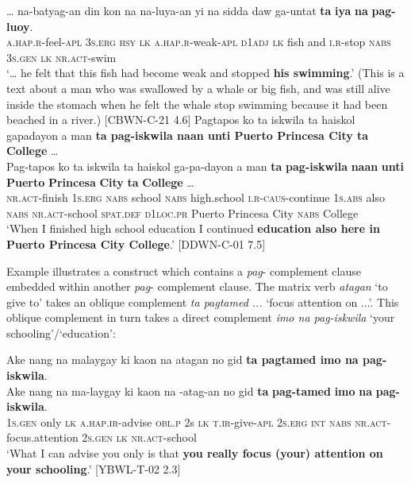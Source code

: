 \gll … na-batyag-an  din  kon  na  na-luya-an  yi  na  sidda daw  ga-untat  \textbf{ta}  \textbf{iya}  \textbf{na}  \textbf{pag-luoy}. \\
{}  \textsc{a.hap.r}-feel-\textsc{apl}  3\textsc{s.erg}  \textsc{hsy}  \textsc{lk}  \textsc{a.hap.r}-weak-\textsc{apl}  \textsc{d}1\textsc{adj}  \textsc{lk}  fish
and  \textsc{i.r}-stop  \textsc{nabs}  3\textsc{s.gen}  \textsc{lk}  \textsc{nr.act}-swim \\
\glt `… he felt that this fish had become weak and stopped \textbf{his swimming}.’ (This is a text about a man who was swallowed by a whale or big fish, and was still alive inside the stomach when he felt the whale stop swimming because it had been beached in a river.) [CBWN-C-21 4.6]
\z
\ea
\label{bkm:Ref114821264}
Pagtapos  ko  ta  iskwila  ta  haiskol  gapadayon a  man  \textbf{ta  pag-iskwila  naan  unti Puerto Princesa City  ta  College} … \smallskip\\
\gll Pag-tapos  ko  ta  iskwila  ta  haiskol  ga-pa-dayon a  man  \textbf{ta}  \textbf{pag-iskwila}  \textbf{naan}  \textbf{unti} \textbf{Puerto} \textbf{Princesa} \textbf{City}  \textbf{ta}  \textbf{College} … \\
\textsc{nr.act}-finish  1\textsc{s.erg}  \textsc{nabs}  school  \textsc{nabs}  high.school  \textsc{i.r}-\textsc{caus}-continue
1\textsc{s.abs}  also  \textsc{nabs}  \textsc{nr.act}-school  \textsc{spat.def}  \textsc{d}1\textsc{loc.pr}
Puerto Princesa City  \textsc{nabs}  College \\
\glt `When I finished high school education I continued \textbf{education also here in Puerto Princesa City College}.’ [DDWN-C-01 7.5]
\z

Example  illustrates a construct which contains a \textit{pag}{}- complement clause embedded within another \textit{pag}{}- complement clause. The matrix verb \textit{atagan} ‘to give to’ takes an oblique complement \textit{ta pagtamed ...} ‘focus attention on ...’. This oblique complement in turn takes a direct complement \textit{imo na pag-iskwila} ‘your schooling’/`education’:

\ea
\label{bkm:Ref477269206}
Ake  nang  na  malaygay  ki  kaon  na  atagan  no gid  \textbf{ta pagtamed imo na pag-iskwila}. \smallskip\\
\gll Ake  nang  na  ma-laygay  ki  kaon  na  \emptyset{}-atag-an  no gid  \textbf{ta}  \textbf{pag-tamed}  \textbf{imo}  \textbf{na}  \textbf{pag-iskwila}. \\
1\textsc{s.gen}  only  \textsc{lk}  \textsc{a.hap.ir}-advise  \textsc{obl.p}  2s  \textsc{lk}  \textsc{t.ir}-give-\textsc{apl}  2\textsc{s.erg}
\textsc{int}  \textsc{nabs}  \textsc{nr.act}-focus.attention  2\textsc{s.gen}  \textsc{lk}  \textsc{nr.act}-school \\
\glt `What I can advise you only is that \textbf{you really focus (your) attention on your schooling}.’ [YBWL-T-02 2.3]
\z

